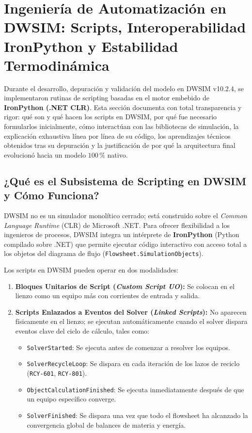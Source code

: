 \documentclass[11pt,a4paper]{article}
\begin{document}
\section{Ingeniería de Automatización en DWSIM: Scripts, Interoperabilidad IronPython y Estabilidad Termodinámica}

Durante el desarrollo, depuración y validación del modelo en DWSIM v10.2.4, se implementaron rutinas de scripting basadas en el motor embebido de \textbf{IronPython (.NET CLR)}. Esta sección documenta con total transparencia y rigor: qué son y qué hacen los scripts en DWSIM, por qué fue necesario formularlos inicialmente, cómo interactúan con las bibliotecas de simulación, la explicación exhaustiva línea por línea de su código, los aprendizajes técnicos obtenidos tras su depuración y la justificación de por qué la arquitectura final evolucionó hacia un modelo $100\,\%$ nativo.

\subsection{¿Qué es el Subsistema de Scripting en DWSIM y Cómo Funciona?}
DWSIM no es un simulador monolítico cerrado; está construido sobre el \textit{Common Language Runtime} (CLR) de Microsoft .NET. Para ofrecer flexibilidad a los ingenieros de procesos, DWSIM integra un intérprete de \textbf{IronPython} (Python compilado sobre .NET) que permite ejecutar código interactivo con acceso total a los objetos del diagrama de flujo (\texttt{Flowsheet.SimulationObjects}).

Los scripts en DWSIM pueden operar en dos modalidades:
\begin{enumerate}
    \item \textbf{Bloques Unitarios de Script (\textit{Custom Script UO}):} Se colocan en el lienzo como un equipo más con corrientes de entrada y salida.
    \item \textbf{Scripts Enlazados a Eventos del Solver (\textit{Linked Scripts}):} No aparecen físicamente en el lienzo; se ejecutan automáticamente cuando el solver dispara eventos clave del ciclo de cálculo, tales como:
    \begin{itemize}
        \item \texttt{SolverStarted}: Se ejecuta antes de comenzar a resolver los equipos.
        \item \texttt{SolverRecycleLoop}: Se dispara en cada iteración de los lazos de reciclo (\texttt{RCY-601}, \texttt{RCY-801}).
        \item \texttt{ObjectCalculationFinished}: Se ejecuta inmediatamente después de que un equipo específico converge.
        \item \texttt{SolverFinished}: Se dispara una vez que todo el flowsheet ha alcanzado la convergencia global de balances de materia y energía.
    \end{itemize}
\end{enumerate}
\end{document}
